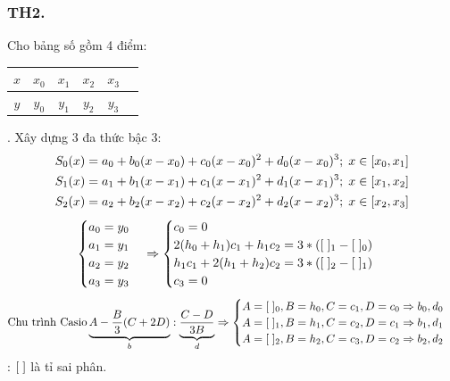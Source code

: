\documentclass[12pt, a4paper]{report}
\begin{document}
\subsubsection{TH2.} Cho bảng số gồm 4 điểm: \begin{tabular}{c|ccccc}
    $x$ & $x_0$ & $x_1$ & $x_2$ & $x_3$ \\ \hline
    $y$ & $y_0$ & $y_1$ & $y_2$ & $y_3$
    \end{tabular}. Xây dựng 3 đa thức bậc 3: 
\[
    \begin{aligned}
        S_0 (x) &= a_0 + b_0(x-x_0) + c_0(x-x_0)^2 + d_0(x-x_0)^3; \thickspace x \in \lbrack x_0,x_1 \rbrack \\
        S_1 (x) &= a_1 + b_1(x-x_1) + c_1(x-x_1)^2 + d_1(x-x_1)^3; \thickspace x \in \lbrack x_1,x_2 \rbrack \\
        S_2 (x) &= a_2 + b_2(x-x_2) + c_2(x-x_2)^2 + d_2(x-x_2)^3; \thickspace x \in \lbrack x_2,x_3 \rbrack 
    \end{aligned}    
\]
\[
    \begin{cases}
        a_0 = y_0 \\
        a_1 = y_1 \\
        a_2 = y_2 \\
        a_3 = y_3
    \end{cases} \Rightarrow 
    \begin{cases}
        c_0 = 0 \\
        2(h_0 + h_1)c_1 + h_1c_2 = 3*(\lbrack \thickspace \rbrack_1 - \lbrack \thickspace \rbrack_0) \\
        h_1c_1 +2(h_1 + h_2)c_2 = 3*(\lbrack \thickspace \rbrack_2 - \lbrack \thickspace \rbrack_1) \\
        c_3 = 0
    \end{cases}    
\]
\[
    \text{Chu trình Casio} \underbrace{A - \frac{B}{3}(C+2D)}_{b} : \underbrace{\frac{C - D}{3B}}_{d} \Rightarrow \begin{cases}
        A = \lbrack \thickspace \rbrack_0, B = h_0, C = c_1, D = c_0 \Rightarrow b_0,d_0 \\
        A = \lbrack \thickspace \rbrack_1, B = h_1, C = c_2, D = c_1 \Rightarrow b_1,d_1 \\
        A = \lbrack \thickspace \rbrack_2, B = h_2, C = c_3, D = c_2 \Rightarrow b_2,d_2
    \end{cases}
\]
: $\lbrack \thickspace \rbrack$ là tỉ sai phân.
\end{document}

